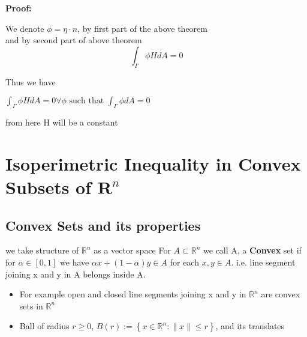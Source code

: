 \documentclass[oneside]{book}
\theoremstyle{definition}
\begin{document}
\textbf{Proof: }  

We denote 
$\phi = \eta\cdot{n}$,
by first part of the above theorem \\ 

and by second part of above theorem 
$$\int_{\Gamma} \phi H d A=0$$

Thus we have \\

\begin{center}
   $ \int_{\Gamma} \phi H d A=0 \forall \phi \text { such that } \int_{\Gamma} \phi d A=0$ \\ 
\end{center}
from here H will be a constant 

\chapter{Isoperimetric Inequality in Convex Subsets of $\mathbf{R}^{n}$ }
  \label{chap:c4}










































\section{Convex Sets and its properties } \label{s:1}
we take structure of  $\mathbb{R}^n$ as a vector space 
For $ A \subset \mathbb{R}^n$ we call A, a \textbf{Convex} set  if for $\alpha \in [0,1]$ we have $\alpha x +(1- \alpha)y \in A $ for each  $x, y \in A.$  i.e. line segment joining x and y in A belongs inside A.\\
\begin{itemize}
    \item  For example open and closed line segments joining x and y in $\mathbb{R}^n$ are convex sets in $\mathbb{R}^n$

\item  

 Ball of radius $r \geq 0$,  $B (r):=\left\{x \in \mathbb{R}^{n}:\|x\| \leq r\right\}$,  and its translates
 
 \end{itemize}
\end{document}
